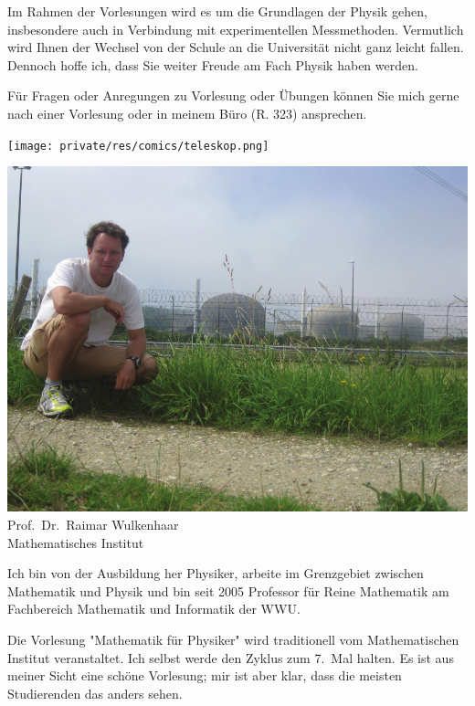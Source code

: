 \begin{multicols}{2}
Im Rahmen der Vorlesungen wird es um die Grundlagen der Physik gehen, insbesondere auch in Verbindung mit experimentellen Messmethoden. Vermutlich wird Ihnen der Wechsel von der Schule an die Universität nicht ganz leicht fallen. Dennoch hoffe ich, dass Sie weiter Freude am Fach Physik haben werden.   

Für Fragen oder Anregungen zu Vorlesung oder Übungen können Sie mich gerne nach einer Vorlesung oder in meinem Büro (R. 323) ansprechen.

\begin{center}
\texttt{[image: private/res/comics/teleskop.png]}
\end{center}
\end{multicols}

\newpage

\begin{multicols}{2}
\begin{center}
\includegraphics[width=0.9\columnwidth]{res/vorstellungsfotos/wulkenhaar.png}\\
Prof.\ Dr.\ Raimar Wulkenhaar\\
Mathematisches Institut
\end{center}

Ich bin von der Ausbildung her Physiker, arbeite im Grenzgebiet zwischen Mathematik und Physik und bin seit 2005 Professor für Reine Mathematik am Fachbereich Mathematik und Informatik der WWU.

Die Vorlesung "Mathematik für Physiker" wird traditionell vom Mathematischen Institut veranstaltet. Ich selbst werde den Zyklus zum 7.~Mal halten. Es ist aus meiner Sicht eine schöne Vorlesung; mir ist aber klar, dass die meisten Studierenden das anders sehen.


\end{multicols}
